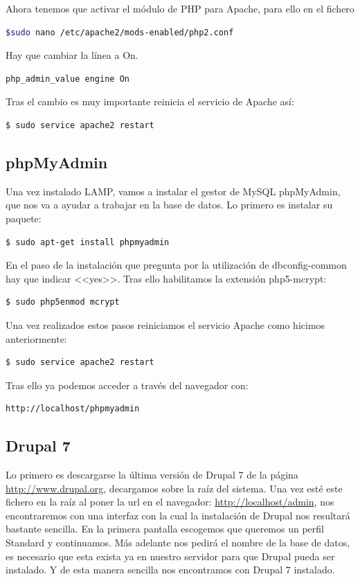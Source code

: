 Ahora tenemos que activar el módulo de PHP para Apache, para ello en el fichero
\begin{lstlisting}[language=bash,frame = single]
$sudo nano /etc/apache2/mods-enabled/php2.conf
\end{lstlisting}
Hay que cambiar la línea a On.
\begin{lstlisting}[language=bash,frame = single]
php_admin_value engine On
\end{lstlisting}
Tras el cambio es muy importante reinicia el servicio de Apache así:
\begin{lstlisting}[language=bash,frame = single]
$ sudo service apache2 restart
\end{lstlisting}

\subsection{phpMyAdmin}
Una vez instalado LAMP, vamos a instalar el gestor de MySQL phpMyAdmin, que nos va a ayudar a trabajar en la base de datos. Lo primero es instalar su paquete:
\begin{lstlisting}[language=bash,frame = single]
$ sudo apt-get install phpmyadmin
\end{lstlisting} 
En el paso de la instalación que pregunta por la utilización de dbconfig-common hay que indicar <<yes>>. Tras ello habilitamos la extensión php5-mcrypt:
\begin{lstlisting}[language=bash,frame = single]
$ sudo php5enmod mcrypt
\end{lstlisting}
Una vez realizados estos pasos reiniciamos el servicio Apache como hicimos anteriormente:
\begin{lstlisting}[language=bash,frame = single]
$ sudo service apache2 restart
\end{lstlisting}
Tras ello ya podemos acceder a través del navegador con:
\begin{lstlisting}[language=html,frame = single]
http://localhost/phpmyadmin
\end{lstlisting}

\subsection{Drupal 7}

Lo primero es descargarse la última versión de Drupal 7 de la página \url{http://www.drupal.org}, decargamos sobre la raíz del sistema. Una vez esté este fichero en la raíz al poner la url en el navegador: \url{http://localhost/admin}, nos encontraremos con una interfaz con la cual la instalación de Drupal nos resultará bastante sencilla.
En la primera pantalla escogemos que queremos un perfil Standard y continuamos. Más adelante nos pedirá el nombre de la base de datos, es necesario que esta exista ya en nuestro servidor para que Drupal pueda ser instalado. Y de esta manera sencilla nos encontramos con Drupal 7 instalado.

